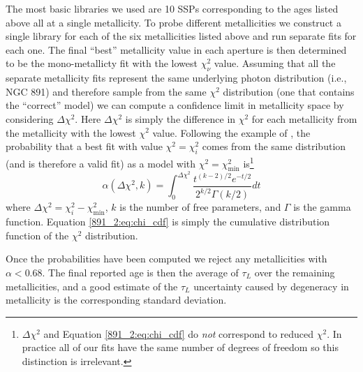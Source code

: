 The most basic libraries we used are 10 SSPs corresponding to the ages
listed above all at a single metallicity. To probe different
metallicities we construct a single library for each of the six
metallicities listed above and run separate fits for each one. The
final ``best'' metallicity value in each aperture is then determined
to be the mono-metallicty fit with the lowest $\chi^2_\nu$ value.
Assuming that all the separate metallicity fits represent the same
underlying photon distribution (i.e., NGC 891) and therefore sample
from the same $\chi^2$ distribution (one that contains the ``correct''
model) we can compute a confidence limit in metallicity space by
considering $\Delta\chi^2$. Here $\Delta\chi^2$ is simply the
difference in $\chi^2$ for each metallicity from the metallicity with
the lowest $\chi^2$ value. Following the example of \citet{Wall03},
the probability that a best fit with value $\chi^2 = \chi^2_i$ comes
from the same distribution (and is therefore a valid fit) as a model
with $\chi^2 = \chi^2_{\mathrm{min}}$ is\footnote{$\Delta\chi^2$ and
  Equation \ref{891_2:eq:chi_cdf} do \emph{not} correspond to reduced
  $\chi^2$. In practice all of our fits have the same number of
  degrees of freedom so this distinction is irrelevant.}
\begin{equation}
\label{891_2:eq:chi_cdf}
\alpha(\Delta\chi^2,k) = \int_0^{\Delta\chi^2}\frac{t^{(k-2)/2}e^{-t/2}}{2^{k/2}\Gamma (k/2)}dt
\end{equation}
where $\Delta\chi^2 = \chi^2_i - \chi^2_{\mathrm{min}}$, $k$ is the number of
free parameters, and $\Gamma$ is the gamma function. Equation \ref{891_2:eq:chi_cdf}
is simply the cumulative distribution function of the $\chi^2$ distribution.

Once the probabilities have been computed we reject any metallicities
with $\alpha < 0.68$. The final reported age is then the average of
$\tau_L$ over the remaining metallicities, and a good estimate of the
$\tau_L$ uncertainty caused by degeneracy in metallicity is the
corresponding standard deviation.


